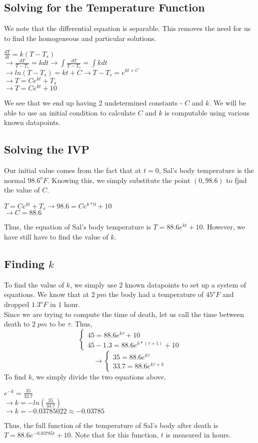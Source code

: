 \documentclass{article}
\begin{document}
	\subsection{Solving for the Temperature Function}
	We note that the differential equation is separable. This removes the need for us to find the homogeneous and particular solutions.
	\begin{center}
		$\frac{dT}{dt} = k(T-T_s)$ \\
		$\rightarrow \frac{dT}{T-T_s} = kdt  \rightarrow \int \frac{dT}{T-T_s} = \int kdt$ \\
		$\rightarrow ln(T-T_s) = kt+C \rightarrow T-T_s = e^{kt+C}$ \\
		$\rightarrow T = Ce^{kt}+T_s$ \\
		$\rightarrow T = Ce^{kt}+10$
	\end{center}
	We see that we end up having 2 undetermined constants - $C$ and $k$. We will be able to use an initial condition to calculate $C$ and $k$ is computable using various known datapoints.
	\subsection{Solving the IVP}
	Our initial value comes from the fact that at $t=0$, Sal's body temperature is the normal $98.6^oF$. Knowing this, we simply substitute the point $(0,98.6)$ to fjnd the value of $C$.
	\begin{center}
		$T = Ce^{kt}+T_s \rightarrow 98.6 = Ce^{k*0}+10$ \\
		$\rightarrow C= 88.6$
	\end{center}
	Thus, the equation of Sal's body temperature is $T = 88.6e^{kt}+10$. However, we have still have to find the value of $k$.
	\subsection{Finding $k$}
	To find the value of $k$, we simply use $2$ known datapoints to set up a system of equations. We know that at $2\;pm$ the body had a temperature of $45^oF$ and dropped $1.3^oF$ in $1$ hour. \\
	Since we are trying to compute the time of death, let us call the time between death to $2\;pm$ to be $\tau$. Thus, \\
	\[
	\left\{ 
	\begin{array}{c}
		45 = 88.6e^{k\tau}+10 \\
		45-1.3 = 88.6e^{k*(\tau+1)}+10
	\end{array}
	\right.
	\]
	\[
	\rightarrow 
	\left\{\begin{array}{c}
		35 = 88.6e^{k\tau}\\
		33.7 = 88.6e^{k\tau+k}
	\end{array} 
	\right.
	\]
	To find $k$, we simply divide the two equations above,
	\begin{center}
	$e^{-k} = \frac{35}{33.7}$ \\
	$\rightarrow k = -ln(\frac{35}{33.7})$ \\
	$\rightarrow k = -0.03785022 \approx -0.03785$
	\end{center}
	Thus, the full function of the temperature of Sal's body after death is $T = 88.6e^{-0.03785t}+10$. Note that for this function, $t$ is measured in hours. 
\end{document}
